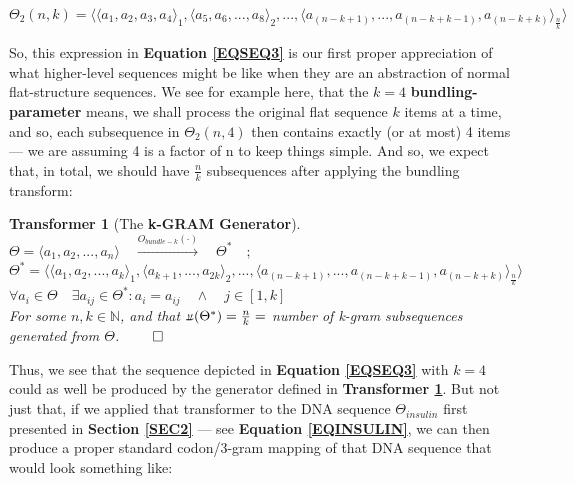 \documentclass[a4paper, 18pt]{article} %
\newtheorem{transf}{Transformer}
\newcommand{\invpi}{\rotatebox[origin=c]{180}{$\pi$}}
\begin{document}
\begin{equation}
\label{EQSEQ3}
\Theta_2(n,k) = \langle \langle a_1, a_2, a_3, a_4 \rangle_1, \langle a_5, a_6,...,a_8 \rangle_2,... , \langle a_{(n-k+1)},...,a_{(n-k+k-1)},a_{(n-k+k)}\rangle_{\frac{n}{k}} \rangle
\end{equation}

So, this expression in \textbf{Equation \ref{EQSEQ3}} is our first proper appreciation of what higher-level sequences might be like when they are an abstraction of normal flat-structure sequences. We see for example here, that the $k=4$ \textbf{bundling-parameter} means, we shall process the original flat sequence $k$ items at a time, and so, each subsequence in $\Theta_2(n,4)$ then contains exactly (or at most) 4 items --- we are assuming 4 is a factor of n to keep things simple. And so, we expect that, in total, we should have $\frac{n}{k}$ subsequences after applying the bundling transform:

\begin{transf}[The \textbf{k-GRAM Generator}]
\label{TRANSFBUND}
$\Theta = \langle a_1, a_2,...,a_n\rangle \quad \xrightarrow{O_{bundle-k}(\cdot)} \quad \Theta^* \quad;$\\
$\Theta^* = \langle \langle a_1, a_2,..., a_k \rangle_1, \langle a_{k+1},...,a_{2k} \rangle_2,... , \langle a_{(n-k+1)},...,a_{(n-k+k-1)},a_{(n-k+k)}\rangle_{\frac{n}{k}} \rangle$\\
$\forall a_i \in \Theta \quad \exists a_{ij} \in \Theta^*: a_i = a_{ij} \quad \land \quad j \in [1,k]$\\
For some $n, k \in \mathbb{N}$, and that $\invpi(\Theta^*) = \frac{n}{k} = $ number of k-gram subsequences generated from $\Theta$. $\qed$
\end{transf}


Thus, we see that the sequence depicted in \textbf{Equation \ref{EQSEQ3}} with $k=4$ could as well be produced by the generator defined in \textbf{Transformer \ref{TRANSFBUND}}. But not just that, if we applied that transformer to the DNA sequence $\Theta_{insulin}$ first presented in \textbf{Section \ref{SEC2}} --- see \textbf{Equation \ref{EQINSULIN}}, we can then produce a proper standard codon/3-gram mapping of that DNA sequence that would look something like:\\


\\
\end{document}
